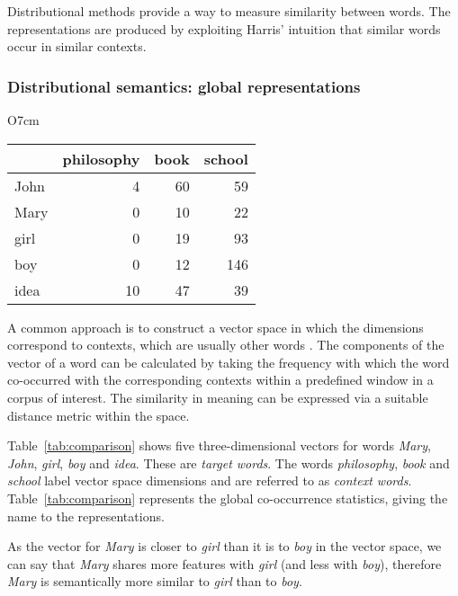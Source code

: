 Distributional methods provide a way to measure similarity between words. The representations are produced by exploiting Harris' \citeyearpar{harris1954distributional} intuition that similar words occur in similar contexts.

\subsubsection{Distributional semantics: global representations}
\label{sec:distr-repr}

\begin{wraptable}[10]{O}{7cm}
  \centering
  \begin{tabular}{lrrr}
    \toprule
    & philosophy & book & school \\
    \midrule
    John & 4  & 60 & 59  \\
    Mary & 0  & 10 & 22  \\
    girl & 0  & 19 & 93  \\
    boy  & 0  & 12 & 146 \\
    idea & 10 & 47 & 39  \\
    \bottomrule
  \end{tabular}
  \caption{Word co-occurrence frequencies extracted from the BNC}
  \label{tab:comparison}
\end{wraptable}

A common approach is to construct a vector space in which the dimensions correspond to contexts, which are usually other words \cite{Turney:2010:FMV:1861751.1861756}. The components of the vector of a word can be calculated by taking the frequency with which the word co-occurred with the corresponding contexts within a predefined window in a corpus of interest. The similarity in meaning can be expressed via a suitable distance metric within the space.

Table~\ref{tab:comparison} shows five three-dimensional vectors for words \textit{Mary}, \textit{John}, \textit{girl}, \textit{boy} and \textit{idea}. These are \textit{target words}.  The words \textit{philosophy}, \textit{book} and \textit{school} label vector space dimensions and are referred to as \emph{context words}. Table~\ref{tab:comparison} represents the global co-occurrence statistics, giving the name to the representations.

As the vector for \textit{Mary} is closer to \textit{girl} than it is to \textit{boy} in the vector space, we can say that \textit{Mary} shares more features with \textit{girl} (and less  with \textit{boy}), therefore \textit{Mary} is semantically more similar to \textit{girl} than to \textit{boy}.

